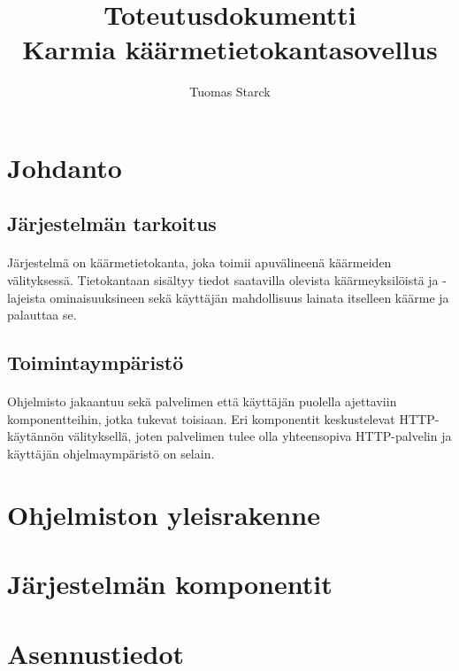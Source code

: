 \documentclass[11pt]{article}
\begin{document}
\title{\Huge{\bf Toteutusdokumentti} \\ \Large{Karmia käärmetietokantasovellus}}
\author{Tuomas Starck}
\maketitle

\vspace{4em}

\section{Johdanto}

\subsection{Järjestelmän tarkoitus}

\paragraph{} Järjestelmä on käärmetietokanta, joka toimii apuvälineenä käärmeiden välityksessä. Tietokantaan sisältyy tiedot saatavilla olevista käärmeyksilöistä ja -lajeista ominaisuuksineen sekä käyttäjän mahdollisuus lainata itselleen käärme ja palauttaa se.

\subsection{Toimintaympäristö}

\paragraph{} Ohjelmisto jakaantuu sekä palvelimen että käyttäjän puolella ajettaviin komponentteihin, jotka tukevat toisiaan. Eri komponentit keskustelevat HTTP-käytännön välityksellä, joten palvelimen tulee olla yhteensopiva HTTP-palvelin ja käyttäjän ohjelmaympäristö on selain.

\section{Ohjelmiston yleisrakenne}

\section{Järjestelmän komponentit}

\section{Asennustiedot}
\end{document}

